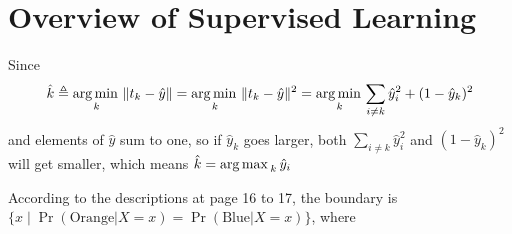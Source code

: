 \section{Overview of Supervised Learning}

\begin{sol}
Since
\[
\hat{k}\triangleq\operatorname*{arg\,min\,}_k\|t_k-\hat{y}\|=\operatorname*{arg\,min\,}_k\|t_k-\hat{y}\|^2=\operatorname*{arg\,min\,}_k\sum_{i\ne k}\hat{y}_i^2+(1-\hat{y}_k)^2
\]
and elements of $\hat{y}$ sum to one, so if $\hat{y}_k$ goes larger, both $\sum_{i\ne k}\hat{y}_i^2$ and $(1-\hat{y}_k)^2$ will get smaller, which means $\hat{k}=\operatorname*{arg\,max\,}_k\hat{y}_i$ 
\end{sol}

\begin{sol}
According to the descriptions at page 16 to 17, the boundary is $\{x\mid \Pr(\mathrm{Orange}\vert X=x) =\Pr(\mathrm{Blue}\vert X=x)\}$, where
\end{sol}

\begin{sol}

\end{sol}

